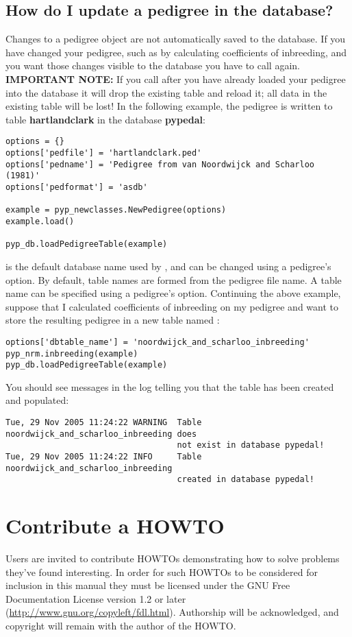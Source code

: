 \subsection{How do I update a pedigree in the database?}
\label{sec:howto-pedigree-db-update-table}
Changes to a \PyPedal{} pedigree object are not automatically saved to the database.  If you have changed
your pedigree, such as by calculating coefficients of inbreeding, and you want those changes visible to the
database you have to call  again.  \textbf{IMPORTANT NOTE:} If you call
 after you have already loaded your pedigree into the database it will
drop the existing table and reload it; all data in the existing table will be lost!  In the following
example, the pedigree is written to table \textbf{hartlandclark} in the database \textbf{pypedal}:
\begin{verbatim}
options = {}
options['pedfile'] = 'hartlandclark.ped'
options['pedname'] = 'Pedigree from van Noordwijck and Scharloo (1981)'
options['pedformat'] = 'asdb'

example = pyp_newclasses.NewPedigree(options)
example.load()

pyp_db.loadPedigreeTable(example)
\end{verbatim}
 is the default database name used by \PyPedal{}, and can be changed using a pedigree's  option.  By default, table names are formed from the pedigree file name.  A table name can be specified using a pedigree's  option.  Continuing the above example, suppose that I calculated coefficients of inbreeding on my pedigree and want to store the resulting pedigree in a new table named :
\begin{verbatim}
options['dbtable_name'] = 'noordwijck_and_scharloo_inbreeding'
pyp_nrm.inbreeding(example)
pyp_db.loadPedigreeTable(example)
\end{verbatim}
You should see messages in the log telling you that the table has been created and populated:
\begin{verbatim}
Tue, 29 Nov 2005 11:24:22 WARNING  Table noordwijck_and_scharloo_inbreeding does
                                   not exist in database pypedal!
Tue, 29 Nov 2005 11:24:22 INFO     Table noordwijck_and_scharloo_inbreeding
                                   created in database pypedal!
\end{verbatim}
\section{Contribute a HOWTO}
\label{sec:howto-contribute}
Users are invited to contribute HOWTOs demonstrating how to solve problems they've found interesting.  In order for such HOWTOs to be considered for inclusion in this manual they must be licensed under the GNU Free Documentation License version 1.2 or later (\url{http://www.gnu.org/copyleft/fdl.html}).  Authorship will be acknowledged, and copyright will remain with the author of the HOWTO.